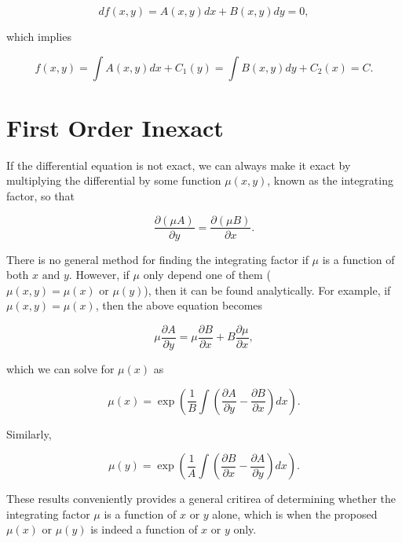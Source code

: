 \documentclass[english,a4paper,12pt]{report}
\begin{document}
\begin{equation}
    df(x,y) = A(x,y)dx + B(x,y)dy = 0,
\end{equation}

which implies 

\begin{equation}
    f(x,y) = \int A(x,y) dx + C_1 (y) = \int B(x,y) dy + C_2 (x) = C. 
\end{equation}




\section{First Order Inexact}

If the differential equation is not exact, we can always make it exact by multiplying the differential by some function \(\mu (x,y)\), known as the integrating factor, so that

\begin{equation}
    \frac{\partial (\mu A)}{\partial y} = \frac{\partial (\mu B)}{\partial x}.  
\end{equation}

There is no general method for finding the integrating factor if \(\mu \) is a function of both \(x \text { and } y\). However, if \(\mu \) only depend one of them (\ie \(\mu (x,y) = \mu (x) \text { or } \mu (y)\)), then it can be found analytically. For example, if \(\mu (x,y) = \mu (x)\), then the above equation becomes

\begin{equation}
    \mu \frac{\partial A}{\partial y} = \mu \frac{\partial B}{\partial x} + B \frac{\partial \mu}{\partial x},
\end{equation}

which we can solve for \(\mu (x)\) as

\begin{equation} \label{mu(x)} 
    \mu (x) = \exp \left( \frac{1}{B} \int \left(\frac{\partial A}{\partial y} -\frac{\partial B}{\partial x} \right)dx  \right).
\end{equation}

Similarly, 

\begin{equation}
    \mu (y) = \exp \left( \frac{1}{A} \int \left(\frac{\partial B}{\partial x} -\frac{\partial A}{\partial y} \right)dx  \right).
\end{equation}

These results conveniently provides a general critirea of determining whether the integrating factor \(\mu \) is a function of \(x\text { or } y\) alone, which is when the proposed \(\mu (x) \text { or } \mu (y)\) is indeed a function of \(x \text { or }  y\) only.    
\end{document}
